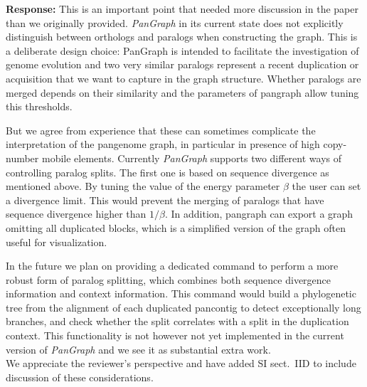 \documentclass[aps,rmp,onecolumn]{revtex4-1}
\newcommand{\response}[1]{{{\color{response}\textbf{Response:} #1}}\vskip 5mm}
\newcommand{\SIalgo}{II}
\begin{document}
\response{
This is an important point that needed more discussion in the paper than we originally provided. 
\textit{PanGraph} in its current state does not explicitly distinguish between orthologs and paralogs when constructing the graph. 
This is a deliberate design choice: PanGraph is intended to facilitate the investigation of genome evolution and two very similar paralogs represent a recent duplication or acquisition that we want to capture in the graph structure. 
Whether paralogs are merged depends on their similarity and the parameters of pangraph allow tuning this thresholds.

But we agree from experience that these can sometimes complicate the interpretation of the pangenome graph, in particular in presence of high copy-number mobile elements.  
Currently \textit{PanGraph} supports two different ways of controlling paralog splits.
The first one is based on sequence divergence as mentioned above.
By tuning the value of the energy parameter $\beta$ the user can set a divergence limit. This would prevent the merging of paralogs that have sequence divergence higher than $1/\beta$.
In addition, pangraph can export a graph omitting all duplicated blocks, which is a simplified version of the graph often useful for visualization.

In the future we plan on providing a dedicated command to perform a more robust form of paralog splitting, which combines both sequence divergence information and context information. This command would build a phylogenetic tree from the alignment of each duplicated pancontig to detect exceptionally long branches, and check whether the split correlates with a split in the duplication context. This functionality is not however not yet implemented in the current version of \textit{PanGraph} and we see it as substantial extra work.\\

We appreciate the reviewer's perspective and have added SI sect.~{\SIalgo}D to include discussion of these considerations.
}
\end{document}
